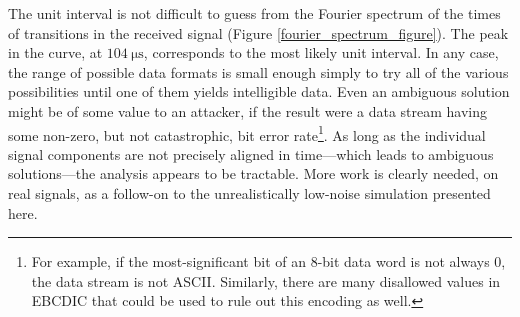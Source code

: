 \documentclass{acmtrans2e}
\begin{document}
The unit interval is not difficult to guess from the Fourier spectrum of the
times of transitions in the received signal
(Figure \ref{fourier_spectrum_figure}).  The peak in the curve, at
$104 \ \mathrm{\mu s}$, corresponds to the most likely unit interval.  In
any case, the range of possible data formats is small enough simply
to try all of the various possibilities until one of them yields intelligible data.
Even an ambiguous solution might be of some value to an attacker, if the result
were a data stream having some non-zero, but not catastrophic, bit error
rate\footnote{For example, if the most-significant bit of an 8-bit data word
is not always 0, the data stream is not ASCII.  Similarly, there are many
disallowed values in EBCDIC that could be used to rule out this encoding as well.}.
As long as the individual signal components are not precisely aligned in
time---which leads to ambiguous solutions---the analysis appears to be tractable.
More work is clearly needed, on real signals, as a follow-on to the unrealistically
low-noise simulation presented here.




\appendix
\end{document}
